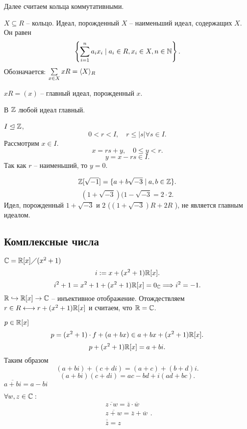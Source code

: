 \documentclass[12pt]{report}
\begin{document}
 \begin{note}
    Далее считаем кольца коммутативными.
\end{note}
\begin{defn}
$X \subseteq R$  -- кольцо.
Идеал, порожденный $X$  -- наименьший идеал, содержащих $X$. Он равен \[
    \left\{\sum\limits_{i=1}^{n}a_ix_i \mid a_i \in  R, x_i \in  X, n \in \mathbb{N}\right\}
.\] 
Обозначается: $\sum\limits_{x \in  X} x R = \langle X \rangle_R$

$xR = (x)$ -- главный идеал, порожденный $x$.
\end{defn}
\begin{ex}
    В $\mathbb{Z}$ любой идеал главный.

    $I \trianglelefteq \mathbb{Z}$,  \[
    0 < r< I, \quad r \le |s| \forall s \in I
    .\] 
    Рассмотрим  $x \in  I$.
    \[
    x = rs + y, \quad 0 \le y < r
    .\] 
    \[
    y = x - rs \in  I
    .\] 
    Так как $r$  -- наименьший, то $y=0$.
\end{ex}
\begin{ex}
    \[
	\mathbb{Z} [ \sqrt{-1}] = \{a + b\sqrt{-3} \mid a, b \in  \mathbb{Z}\}
    .\] 
    \[
	(1 + \sqrt{-3} )(1 - \sqrt{-3} = 2 \cdot 2
    .\] 
    Идел, порожденный $1+\sqrt{-3}$ и $2$ ($(1 + \sqrt{-3}) R + 2 R $ ), не является главным идеалом. 
\end{ex}
\subsection{Комплексные числа}
    $\mathbb{C} = \mathbb{R}[x]\diagup (x^2+1)$
    \[
	i := x + (x^2+1) \mathbb{R}[x]
    .\] 
    \[
	i^2+1 = x^2 + 1 + (x^2+1)\mathbb{R}[x] = 0_{\mathbb{C}} \Longrightarrow i^2 = -1
    .\] 
    $\mathbb{R} \hookrightarrow \mathbb{R}[x] \to \mathbb{C}$ -- инъективное отображение.   
    Отождествляем $r \in  R \longleftrightarrow r + (x^2+1) \mathbb{R}[x]$ и считаем, что $\mathbb{R} = \mathbb{C}$.

   $p \in  \mathbb{R}[x]$
   \[
       p = (x^2 + 1) \cdot f + (a + b x) \in  a + bx + (x^2 + 1)\mathbb{R}[x]
   .\] 
   \[
       p + (x^2+1) \mathbb{R}[x] = a + bi
   .\] 
   Таким образом \[
       (a + bi) + (c + di) = (a+c)+ (b+d)i
   .\] 
   \[
       (a + bi)(c + di) = ac - bd + i (ad+bc)
   .\] 
  $\overline{a+ bi} = a-bi $

   $ \forall  w, z \in  \mathbb{C}:$
   \[
       \begin{array}{c}
	   \overline{z\cdot w} = \overline{z} \cdot \overline{w}\\
	   \overline{z + w} = \overline{z} + \overline{w}\\
	   \overline{\overline{z}} = z
       \end{array}
   .\] 
\end{document}

